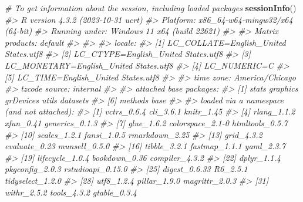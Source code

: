 \documentclass[
]{book}
\newenvironment{Shaded}{\begin{snugshade}}{\end{snugshade}}
\newcommand{\CommentTok}[1]{\textcolor[rgb]{0.56,0.35,0.01}{\textit{#1}}}
\newcommand{\FunctionTok}[1]{\textcolor[rgb]{0.13,0.29,0.53}{\textbf{#1}}}
\newcommand{\NormalTok}[1]{#1}
\begin{document}
\begin{Shaded}
\begin{Highlighting}[]
\CommentTok{\# To get information about the session, including loaded packages}
\FunctionTok{sessionInfo}\NormalTok{()}
\CommentTok{\#\textgreater{} R version 4.3.2 (2023{-}10{-}31 ucrt)}
\CommentTok{\#\textgreater{} Platform: x86\_64{-}w64{-}mingw32/x64 (64{-}bit)}
\CommentTok{\#\textgreater{} Running under: Windows 11 x64 (build 22621)}
\CommentTok{\#\textgreater{} }
\CommentTok{\#\textgreater{} Matrix products: default}
\CommentTok{\#\textgreater{} }
\CommentTok{\#\textgreater{} }
\CommentTok{\#\textgreater{} locale:}
\CommentTok{\#\textgreater{} [1] LC\_COLLATE=English\_United States.utf8 }
\CommentTok{\#\textgreater{} [2] LC\_CTYPE=English\_United States.utf8   }
\CommentTok{\#\textgreater{} [3] LC\_MONETARY=English\_United States.utf8}
\CommentTok{\#\textgreater{} [4] LC\_NUMERIC=C                          }
\CommentTok{\#\textgreater{} [5] LC\_TIME=English\_United States.utf8    }
\CommentTok{\#\textgreater{} }
\CommentTok{\#\textgreater{} time zone: America/Chicago}
\CommentTok{\#\textgreater{} tzcode source: internal}
\CommentTok{\#\textgreater{} }
\CommentTok{\#\textgreater{} attached base packages:}
\CommentTok{\#\textgreater{} [1] stats     graphics  grDevices utils     datasets }
\CommentTok{\#\textgreater{} [6] methods   base     }
\CommentTok{\#\textgreater{} }
\CommentTok{\#\textgreater{} loaded via a namespace (and not attached):}
\CommentTok{\#\textgreater{}  [1] vctrs\_0.6.4       cli\_3.6.1         knitr\_1.45       }
\CommentTok{\#\textgreater{}  [4] rlang\_1.1.2       xfun\_0.41         generics\_0.1.3   }
\CommentTok{\#\textgreater{}  [7] glue\_1.6.2        colorspace\_2.1{-}0  htmltools\_0.5.7  }
\CommentTok{\#\textgreater{} [10] scales\_1.2.1      fansi\_1.0.5       rmarkdown\_2.25   }
\CommentTok{\#\textgreater{} [13] grid\_4.3.2        evaluate\_0.23     munsell\_0.5.0    }
\CommentTok{\#\textgreater{} [16] tibble\_3.2.1      fastmap\_1.1.1     yaml\_2.3.7       }
\CommentTok{\#\textgreater{} [19] lifecycle\_1.0.4   bookdown\_0.36     compiler\_4.3.2   }
\CommentTok{\#\textgreater{} [22] dplyr\_1.1.4       pkgconfig\_2.0.3   rstudioapi\_0.15.0}
\CommentTok{\#\textgreater{} [25] digest\_0.6.33     R6\_2.5.1          tidyselect\_1.2.0 }
\CommentTok{\#\textgreater{} [28] utf8\_1.2.4        pillar\_1.9.0      magrittr\_2.0.3   }
\CommentTok{\#\textgreater{} [31] withr\_2.5.2       tools\_4.3.2       gtable\_0.3.4}
\end{Highlighting}
\end{Shaded}
\end{document}
